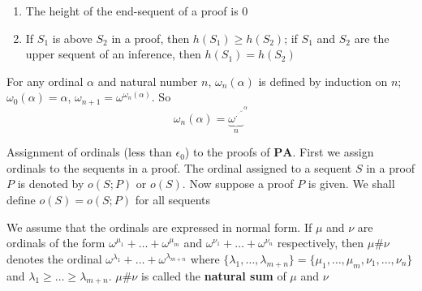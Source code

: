 \documentclass[11pt]{article}
\def \PA {\textbf{PA}}
\begin{document}
\begin{proposition}[]
\label{prop12.5}
\begin{enumerate}
\item The height of the end-sequent of a proof is 0
\item If \(S_1\) is above \(S_2\) in a proof, then \(h(S_1)\ge h(S_2)\); if \(S_1\) and \(S_2\) are
the upper sequent of an inference, then \(h(S_1)=h(S_2)\)
\end{enumerate}
\end{proposition}

For any ordinal \(\alpha\) and natural number \(n\), \(\omega_n(\alpha)\) is defined by induction on \(n\);
\(\omega_0(\alpha)=\alpha\), \(\omega_{n+1}=\omega^{\omega_n(\alpha)}\). So
\begin{equation*}
 \omega_n(\alpha)={\underbrace{\omega^{\cdot^{\cdot^{\cdot^{\omega}}}}}_{n}}^{^{\alpha}}
\end{equation*}

\begin{definition}[]
Assignment of ordinals (less than \(\epsilon_0\)) to the proofs of \(\PA\). First we assign
ordinals to the sequents in a proof. The ordinal assigned to a sequent \(S\) in a proof \(P\) is
denoted by \(o(S;P)\) or \(o(S)\). Now suppose a proof \(P\) is given. We shall
define \(o(S)=o(S;P)\) for all sequents
\end{definition}

We assume that the ordinals are expressed in normal form. If \(\mu\) and \(\nu\) are ordinals of the form
\(\omega^{\mu_1}+\dots+\omega^{\mu_m}\) and \(\omega^{\nu_1}+\dots+\omega^{\nu_n}\) respectively,
then \(\mu\#\nu\) denotes the ordinal \(\omega^{\lambda_1}+\dots+\omega^{\lambda_{m+n}}\) where
\(\{\lambda_1,\dots,\lambda_{m+n}\}=\{\mu_1,\dots,\mu_m,\nu_1,\dots,\nu_n\}\) and
\(\lambda_1\ge\dots\ge\lambda_{m+n}\). \(\mu\#\nu\) is called the \textbf{natural sum} of \(\mu\) and \(\nu\)
\end{document}

